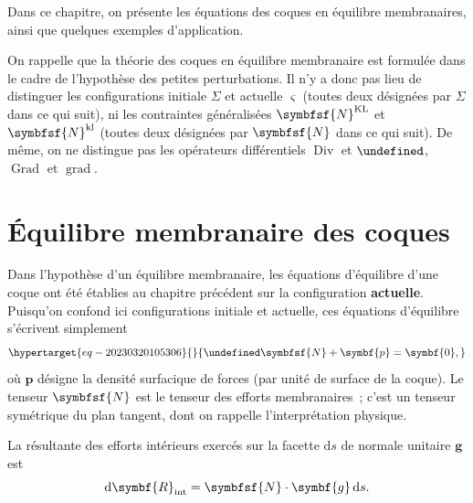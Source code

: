 \documentclass[
  a4paper,
  DIV=11,
  numbers=noendperiod]{scrreprt}
\newcommand{\D}{{\mathrm d}}
\newcommand{\Div}{\operatorname{Div}}
\let\div\undefined
\newcommand{\div}{\operatorname{div}}
\newcommand{\Grad}{\operatorname{Grad}}
\newcommand{\grad}{\operatorname{grad}}
\newcommand{\internal}{\mathrm{int}}
\newcommand{\KL}{\mathrm{KL}}
\newcommand{\kl}{\mathrm{kl}}
\newcommand{\tens}[1]{\symbfsf{#1}}
\renewcommand{\vec}[1]{\symbf{#1}}
\begin{document}
Dans ce chapitre, on présente les équations des coques en équilibre
membranaires, ainsi que quelques exemples d'application.

On rappelle que la théorie des coques en équilibre membranaire est
formulée dans le cadre de l'hypothèse des petites perturbations. Il n'y
a donc pas lieu de distinguer les configurations initiale \(\Sigma\) et
actuelle \(\varsigma\) (toutes deux désignées par \(\Sigma\) dans ce qui
suit), ni les contraintes généralisées \(\tens{N}^\KL\) et
\(\tens{N}^\kl\) (toutes deux désignées par \(\tens{N}\) dans ce qui
suit). De même, on ne distingue pas les opérateurs différentiels
\(\Div\) et \(\div\), \(\Grad\) et \(\grad\).

\hypertarget{uxe9quilibre-membranaire-des-coques}{%
\section{Équilibre membranaire des
coques}\label{uxe9quilibre-membranaire-des-coques}}

Dans l'hypothèse d'un équilibre membranaire, les équations d'équilibre
d'une coque ont été établies au chapitre précédent sur la configuration
\textbf{actuelle}. Puisqu'on confond ici configurations initiale et
actuelle, ces équations d'équilibre s'écrivent simplement
\begin{equation}\protect\hypertarget{eq-20230320105306}{}{
\div \tens{N} + \vec{p} = \vec{0},
}\label{eq-20230320105306}\end{equation} où \(\vec{p}\) désigne la
densité surfacique de forces (par unité de surface de la coque). Le
tenseur \(\tens{N}\) est le tenseur des efforts membranaires~; c'est un
tenseur symétrique du plan tangent, dont on rappelle l'interprétation
physique.

\begin{tcolorbox}[enhanced jigsaw, toptitle=1mm, title=\textcolor{quarto-callout-warning-color}{\faExclamationTriangle}\hspace{0.5em}{Interprétation physique des contraintes membranaires}, colbacktitle=quarto-callout-warning-color!10!white, toprule=.15mm, left=2mm, bottomrule=.15mm, arc=.35mm, breakable, opacityback=0, colframe=quarto-callout-warning-color-frame, bottomtitle=1mm, titlerule=0mm, leftrule=.75mm, opacitybacktitle=0.6, coltitle=black, rightrule=.15mm, colback=white]

La résultante des efforts intérieurs exercés sur la facette \(\D s\) de
normale unitaire \(\vec{g}\) est \[
\D \vec{R}_\internal = \tens{N} \cdot \vec{g} \, \D s.
\]

\end{tcolorbox}
\end{document}
